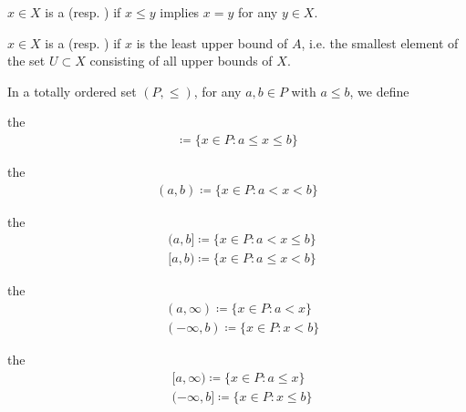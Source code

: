 \begin{definition}
\begin{defenum}
    \item\label{def:poset/maximal_minimal_element}\cite[170]{Enderton1977} $x \in X$ is a  (resp. ) if $x \leq y$ implies $x = y$ for any $y \in X$.

    \item\label{def:poset/supremum_infimum}\cite[170]{Enderton1977} $x \in X$ is a  (resp. ) if $x$ is the least upper bound of $A$, i.e. the smallest element of the set $U \subset X$ consisting of all upper bounds of $X$.
  \end{defenum}
\end{definition}

\begin{definition}\label{def:total_order_interval}\cite{nLab:order_topology}
  In a totally ordered set $(P, \leq)$, for any $a, b \in P$ with $a \leq b$, we define
  \begin{defenum}
    \item\label{def:total_order_interval/closed} the 
    \begin{align*}
      [a, b] \coloneqq \{ x \in P \colon a \leq x \leq b \}
    \end{align*}

    \item\label{def:total_order_interval/open} the 
    \begin{align*}
      (a, b) \coloneqq \{ x \in P \colon a < x < b \}
    \end{align*}

    \item\label{def:total_order_interval/half_open} the 
    \begin{align*}
      &(a, b] \coloneqq \{ x \in P \colon a < x \leq b \}
      \\
      &[a, b) \coloneqq \{ x \in P \colon a \leq x < b \}
    \end{align*}

    \item\label{def:total_order_interval/open_ray} the 
    \begin{align*}
      &(a, \infty) \coloneqq \{ x \in P \colon a < x \}
      \\
      &(-\infty, b) \coloneqq \{ x \in P \colon x < b \}
    \end{align*}

    \item\label{def:total_order_interval/closed_ray} the 
    \begin{align*}
      &[a, \infty) \coloneqq \{ x \in P \colon a \leq x \}
      \\
      &(-\infty, b] \coloneqq \{ x \in P \colon x \leq b \}
    \end{align*}
  \end{defenum}
\end{definition}

